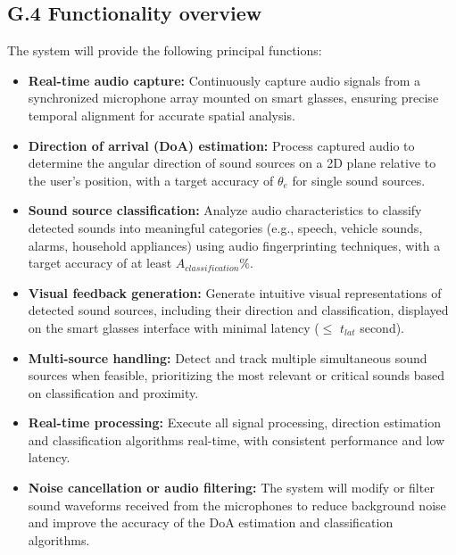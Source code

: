 \documentclass[12pt]{article}
\theoremstyle{definition}
\begin{document}
\subsection{G.4 Functionality overview} \label{sec:g4}

The system will provide the following principal functions:

\begin{itemize}
\item \textbf{Real-time audio capture:} Continuously capture audio signals from
a synchronized microphone array mounted on smart glasses, ensuring precise
temporal alignment for accurate spatial analysis.

\item \textbf{Direction of arrival (DoA) estimation:} Process captured audio to
determine the angular direction of sound sources on a 2D plane relative to the
user's position, with a target accuracy of \hyperref[symbol:theta_e]{$\theta_e$}
for single sound sources.

\item \textbf{Sound source classification:} Analyze audio characteristics to
classify detected sounds into meaningful categories (e.g., speech, vehicle
sounds, alarms, household appliances) using audio fingerprinting techniques,
with a target accuracy of at least
\hyperref[symbol:A_classfication]{$A_{classification}\%$}.

\item \textbf{Visual feedback generation:} Generate intuitive visual
representations of detected sound sources, including their direction and
classification, displayed on the smart glasses interface with minimal latency
($\leq$ \hyperref[symbol:t_lat]{$t_{lat}$} second).

\item \textbf{Multi-source handling:} Detect and track multiple simultaneous
sound sources when feasible, prioritizing the most relevant or critical sounds
based on classification and proximity.

\item \textbf{Real-time processing:} Execute all signal processing, direction
estimation and classification algorithms real-time, with consistent performance
and low latency.

\item \textbf{Noise cancellation or audio filtering:} The system will modify or
filter sound waveforms received from the microphones to reduce background noise
and improve the accuracy of the DoA estimation and classification algorithms.
\end{itemize}
\end{document}
